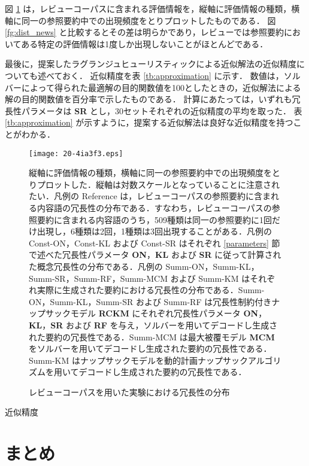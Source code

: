 \documentclass[japanese]{jnlp_1.4}
\begin{document}
図 \ref{fg:dist_review} は，レビューコーパスに含まれる評価情報を，縦軸に評価情報の種類，横軸に同一の参照要約中での出現頻度をとりプロットしたものである．
図 \ref{fg:dist_news} と比較するとその差は明らかであり，レビューでは参照要約においてある特定の評価情報は1度しか出現しないことがほとんどである．

最後に，提案したラグランジュヒューリスティックによる近似解法の近似精度についても述べておく．
近似精度を表 \ref{tb:approximation} に示す．
数値は，ソルバーによって得られた最適解の目的関数値を100としたときの，近似解法による解の目的関数値を百分率で示したものである．
計算にあたっては，いずれも冗長性パラメータは {\bf SR} とし，30セットそれぞれの近似精度の平均を取った．
表 \ref{tb:approximation} が示すように，提案する近似解法は良好な近似精度を持つことがわかる．

\begin{figure}[p]
\begin{center}
\texttt{[image: 20-4ia3f3.eps]}
\end{center}
\caption{ レビューコーパスを用いた実験における冗長性の分布}
\label{fg:dist_review}
\small
縦軸に評価情報の種類，横軸に同一の参照要約中での出現頻度をとりプロットした．縦軸は対数スケールとなっていることに注意されたい．凡例の Reference は，レビューコーパスの参照要約に含まれる内容語の冗長性の分布である．すなわち，レビューコーパスの参照要約に含まれる内容語のうち，509種類は同一の参照要約に1回だけ出現し，6種類は2回，1種類は3回出現することがある．凡例の Const-ON，Const-KL および Const-SR はそれぞれ \ref{parameters} 節で述べた冗長性パラメータ {\bf ON}，{\bf KL} および {\bf SR} に従って計算された概念冗長性の分布である．凡例の Summ-ON，Summ-KL，Summ-SR，Summ-RF，Summ-MCM および Summ-KM はそれぞれ実際に生成された要約における冗長性の分布である．Summ-ON，Summ-KL，Summ-SR および Summ-RF は冗長性制約付きナップサックモデル {\bf RCKM} にそれぞれ冗長性パラメータ {\bf ON}，{\bf KL}，{\bf SR} および {\bf RF} を与え，ソルバーを用いてデコードし生成された要約の冗長性である．Summ-MCM は最大被覆モデル {\bf MCM} をソルバーを用いてデコードし生成された要約の冗長性である．Summ-KM はナップサックモデルを動的計画ナップサックアルゴリズムを用いてデコードし生成された要約の冗長性である．
\end{figure}
\begin{table}[p]
\caption{近似精度}
\label{tb:approximation}

\end{table}



\section{まとめ}
\end{document}
